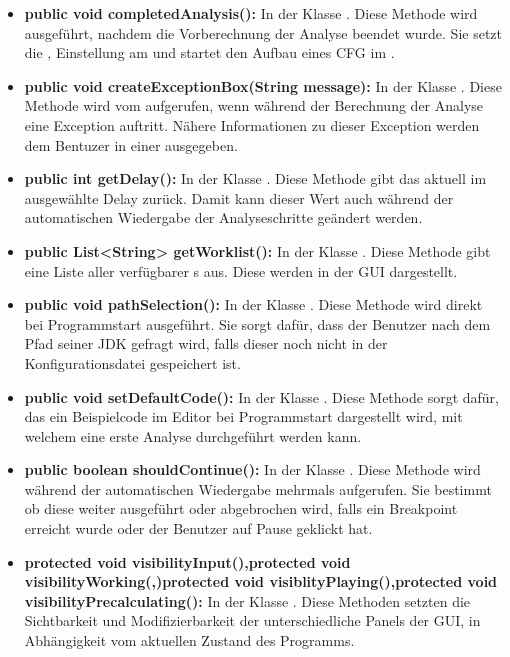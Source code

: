 \begin{itemize}
	\item \textbf{public void completedAnalysis():} In der Klasse . Diese Methode wird ausgeführt, nachdem die Vorberechnung der Analyse beendet wurde. Sie setzt die , Einstellung am  und startet den Aufbau eines CFG im .

	\item \textbf{public void createExceptionBox(String message):} In der Klasse . Diese Methode wird vom  aufgerufen, wenn während der Berechnung der Analyse eine Exception auftritt. Nähere Informationen zu dieser Exception werden dem Bentuzer in einer  ausgegeben.

	\item \textbf{public int getDelay():} In der Klasse . Diese Methode gibt das aktuell im  ausgewählte Delay zurück. Damit kann dieser Wert auch während der automatischen Wiedergabe der Analyseschritte geändert werden.

	\item \textbf{public List<String> getWorklist():} In der Klasse . Diese Methode gibt eine Liste aller verfügbarer s aus. Diese werden in der GUI dargestellt.

	\item \textbf{public void pathSelection():} In der Klasse . Diese Methode wird direkt bei Programmstart ausgeführt. Sie sorgt dafür, dass der Benutzer nach dem Pfad seiner JDK gefragt wird, falls dieser noch nicht in der Konfigurationsdatei gespeichert ist.

	\item \textbf{public void setDefaultCode():} In der Klasse . Diese Methode sorgt dafür, das ein Beispielcode im Editor bei Programmstart dargestellt wird, mit welchem eine erste Analyse durchgeführt werden kann.

	\item \textbf{public boolean shouldContinue():} In der Klasse . Diese Methode wird während der automatischen Wiedergabe mehrmals aufgerufen. Sie bestimmt ob diese weiter ausgeführt oder abgebrochen wird, falls ein Breakpoint erreicht wurde oder der Benutzer auf Pause geklickt hat.

	\item \textbf{protected void visibilityInput(),}\textbf{protected void visibilityWorking(,)}\textbf{protected void visiblityPlaying(),}\textbf{protected void visibilityPrecalculating():} In der Klasse . Diese Methoden setzten die Sichtbarkeit und Modifizierbarkeit der unterschiedliche Panels der GUI, in Abhängigkeit vom aktuellen Zustand des Programms.
\end{itemize}

